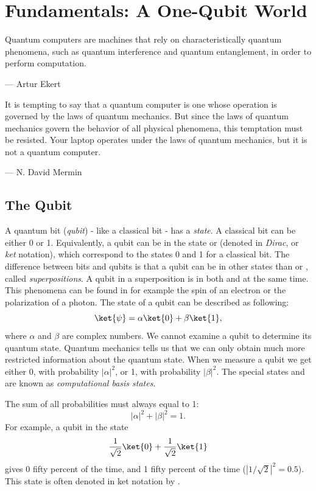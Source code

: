 \chapter{Fundamentals: A One-Qubit World}
\epigraph{Quantum computers are machines that rely on characteristically quantum phenomena, such as quantum interference and quantum entanglement, in order to perform computation.}{--- Artur Ekert}

\epigraph{It is tempting to say that a quantum computer is one whose operation is governed by the laws of quantum mechanics. But since the laws of quantum mechanics govern the behavior of all physical phenomena, this temptation must be resisted. Your laptop operates under the laws of quantum mechanics, but it is not a quantum computer.}{--- N. David Mermin}

\section{The Qubit}
A quantum bit (\emph{qubit}) - like a classical bit - has a \emph{state}. A classical bit can be either 0 or 1. Equivalently, a qubit can be in the state  or  (denoted in \emph{Dirac}, or \emph{ket} notation), which correspond to the states 0 and 1 for a classical bit. The difference between bits and qubits is that a qubit can be in other states than  or , called \emph{superpositions}. A qubit in a superposition is in both  and  at the same time. This phenomena can be found in for example the spin of an electron or the polarization of a photon. The state of a qubit can be described as following:
\begin{equation}
  \ket{\psi} = \alpha\ket{0} + \beta\ket{1},
\end{equation}
where $\alpha$ and $\beta$ are complex numbers. We cannot examine a qubit to determine its quantum state. Quantum mechanics tells us that we can only obtain much more restricted information about the quantum state. When we measure a qubit we get either 0, with probability $|\alpha|^2$, or 1, with probability $|\beta|^2$. The special states  and  are known as \emph{computational basis states}.

The sum of all probabilities must always equal to 1:
\begin{equation}
  |\alpha|^2 + |\beta|^2 = 1.
\end{equation}
For example, a qubit in the state
\begin{equation}
  \dfrac{1}{\sqrt2}\ket{0}+\dfrac{1}{\sqrt2}\ket{1}
\end{equation}
gives 0 fifty percent of the time, and 1 fifty percent of the time ($|1/\sqrt2|^2 = 0.5$). This state is often denoted in ket notation by \ket{+}.

